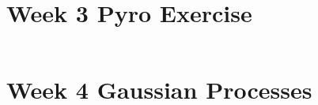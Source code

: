\newpage
\section{Week 3 Pyro Exercise}
\label{sec:week3:code:pyro}
\inputminted{Python}{../src/week3_pyro.py}

\newpage
\section{Week 4 Gaussian Processes}
\label{sec:week4:code:gp}
\inputminted{Python}{../src/week4_gp.py}
